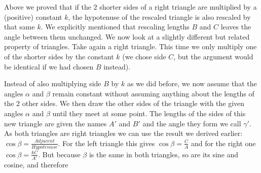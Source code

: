 \noindent Above we proved that if the $2$ shorter sides of a right triangle are multiplied by a (positive) constant $k$, the hypotenuse of the rescaled triangle is also rescaled by that same $k$. We explicitly mentioned that rescaling lengths $B$ and $C$ leaves the angle between them unchanged. We now look at a slightly different but related property of triangles. Take again a right triangle. This time we only multiply one of the shorter sides by the constant $k$ (we chose side $C$, but the argument would be identical if we had chosen $B$ instead). 
\begin{center}
\end{center}
\noindent Instead of also multiplying side $B$ by $k$ as we did before, we now assume that the angles $\alpha$ and $\beta$ remain constant without assuming anything about the lengths of the $2$ other sides. We then draw the other sides of the triangle with the given angles $\alpha$ and $\beta$ until they meet at some point. The lengths of the sides of this new triangle are given the names $A'$ and $B'$ and the angle they form we call $\gamma'$. As both triangles are right triangles we can use the result we derived earlier: $\cos \beta = \frac{Adjacent}{Hypotenuse}$. For the left triangle this gives $\cos \beta = \frac{C}{A}$ and for the right one $\cos \beta = \frac{kC}{A'}$. But because $\beta$ is the same in both triangles, so are its sine and cosine, and therefore

